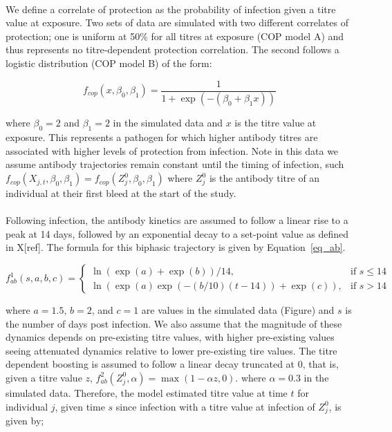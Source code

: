 \documentclass{article}
\begin{document}
\paragraph{}We define a correlate of protection as the probability of infection given a titre value at exposure. Two sets of data are simulated with two different correlates of protection; one is uniform at 50\% for all titres at exposure (COP model A) and thus represents no titre-dependent protection correlation. The second follows a logistic distribution (COP model B) of the form:

\begin{equation}
\label{eq_cop}
f_{cop}(x, \beta_0, \beta_1) = \frac{1}{1 + \exp(- (\beta_0 + \beta_1x))}
\end{equation}

where $\beta_0 = 2$ and $\beta_1 = 2$ in the simulated data and $x$ is the titre value at exposure. This represents a pathogen for which higher antibody titres are associated with higher levels of protection from infection. Note in this data we assume antibody trajectories remain constant until the timing of infection, such $f_{cop}(X_{j, t}, \beta_0, \beta_1) = f_{cop}(Z^0_{j}, \beta_0, \beta_1)$ where $Z^0_{j}$ is the antibody titre of an individual at their first bleed at the start of the study.

\paragraph{}Following infection, the antibody kinetics are assumed to follow a linear rise to a peak at 14 days, followed by an exponential decay to a set-point value as defined in X[ref]. The formula for this biphasic trajectory is given by Equation~\ref{eq_ab}.

\begin{equation}
\label{eq_ab}
f^1_{ab}(s, a, b, c) =
\begin{cases}
  \ln(\exp(a) + \exp(b)) / 14, & \text{if }s \leq 14 \\
  \ln(\exp(a) \exp(-(b/10)(t - 14)) + \exp(c)), &\text{if } s > 14
\end{cases}
\end{equation}

where $a = 1.5$, $b = 2$, and $c = 1$ are values in the simulated data (Figure) and $s$ is the number of days post infection. We also assume that the magnitude of these dynamics depends on pre-existing titre values, with higher pre-existing values seeing attenuated dynamics relative to lower pre-existing tire values. The titre dependent boosting is assumed to follow a linear decay truncated at 0, that is, given a titre value $z$, $f^2_{ab}(Z_j^0, \alpha) = \max(1 - \alpha z, 0)$. where $\alpha = 0.3$ in the simulated data. Therefore, the model estimated titre value at time $t$ for individual $j$, given time $s$ since infection with a titre value at infection of $Z_{j}^0$, is given by;  
\end{document}
